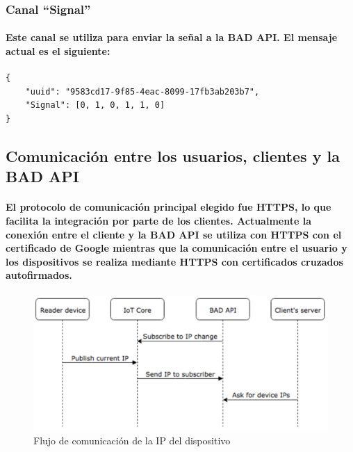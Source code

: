 \documentclass{article}
\begin{document}
\subsubsection{Canal “Signal”}
\paragraph{
Este canal se utiliza para enviar la señal a la BAD API. El mensaje actual es el siguiente:
}
\begin{verbatim}
{
    "uuid": "9583cd17-9f85-4eac-8099-17fb3ab203b7",
    "Signal": [0, 1, 0, 1, 1, 0]
}
\end{verbatim}

\subsection{Comunicación entre los usuarios, clientes y la BAD API}
\paragraph{
El protocolo de comunicación principal elegido fue HTTPS, lo que facilita la integración por parte de los clientes. Actualmente la conexión entre el cliente y la BAD API se utiliza con HTTPS con el certificado de Google mientras que la comunicación entre el usuario y los dispositivos se realiza mediante HTTPS con certificados cruzados autofirmados.
}

\begin{figure}[ht]
    \centering
    \includegraphics[width=\textwidth]{ipexchange.png}%
    \caption{Flujo de comunicación de la IP del dispositivo}
    \label{fig:ipexchange}
\end{figure}
\end{document}

